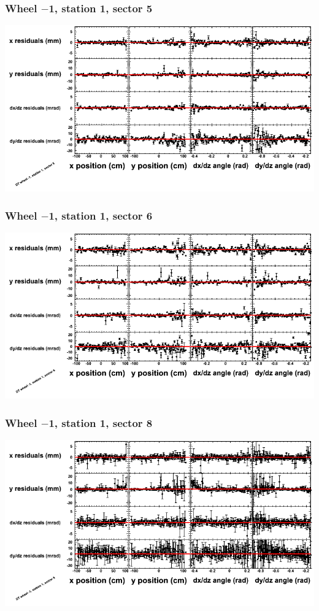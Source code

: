 \documentclass[compress]{beamer}
\begin{document}
\begin{frame}
\frametitle{Wheel $-$1, station 1, sector 5}
\includegraphics[width=\linewidth]{tmppoly_MBwhBst1sec05.png}
\end{frame}

\begin{frame}
\frametitle{Wheel $-$1, station 1, sector 6}
\includegraphics[width=\linewidth]{tmppoly_MBwhBst1sec06.png}
\end{frame}

\begin{frame}
\frametitle{Wheel $-$1, station 1, sector 8}
\includegraphics[width=\linewidth]{tmppoly_MBwhBst1sec08.png}
\end{frame}
\end{document}
